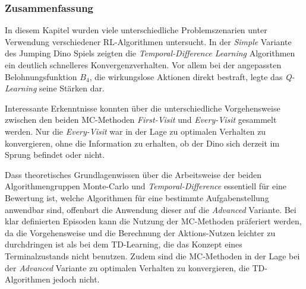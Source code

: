 \subsubsection{Zusammenfassung}
In diesem Kapitel wurden viele unterschiedliche Problemszenarien unter Verwendung verschiedener RL-Algorithmen untersucht. In der \textit{Simple} Variante des Jumping Dino Spiels zeigten die \textit{Temporal-Difference Learning} Algorithmen ein deutlich schnelleres Konvergenzverhalten. Vor allem bei der angepassten Belohnungsfunktion $B_4$, die wirkungslose Aktionen direkt bestraft, legte das \textit{Q-Learning} seine Stärken dar.
\par 
Interessante Erkenntnisse konnten über die unterschiedliche Vorgehensweise zwischen den beiden MC-Methoden \textit{First-Visit} und \textit{Every-Visit} gesammelt werden. Nur die \textit{Every-Visit} war in der Lage zu optimalen Verhalten zu konvergieren, ohne die Information zu erhalten, ob der Dino sich derzeit im Sprung befindet oder nicht.
\par 
Dass theoretisches Grundlagenwissen über die Arbeitsweise der beiden Algorithmengruppen Monte-Carlo und \textit{Temporal-Difference} essentiell für eine Bewertung ist, welche Algorithmen für eine bestimmte Aufgabenstellung anwendbar sind, offenbart die Anwendung dieser auf die \textit{Advanced} Variante. Bei klar definierten Episoden kann die Nutzung der MC-Methoden präferiert werden, da die Vorgehensweise und die Berechnung der Aktions-Nutzen leichter zu durchdringen ist als bei dem TD-Learning, die das Konzept eines Terminalzustands nicht benutzen. Zudem sind die MC-Methoden in der Lage bei der \textit{Advanced} Variante zu optimalen Verhalten zu konvergieren, die TD-Algorithmen jedoch nicht. 